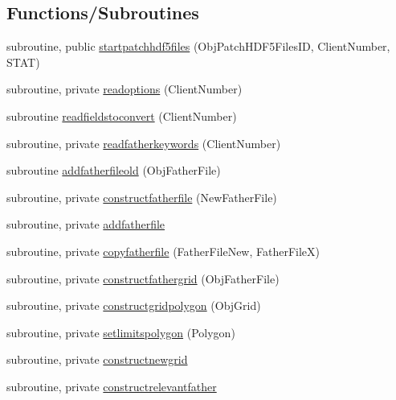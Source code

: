 \subsection*{Functions/\+Subroutines}
\begin{DoxyCompactItemize}
\item 
subroutine, public \mbox{\hyperlink{namespacemodulepatchhdf5files_a3b72c3b4723946c225c3539103a6662e}{startpatchhdf5files}} (Obj\+Patch\+H\+D\+F5\+Files\+ID, Client\+Number, S\+T\+AT)
\item 
subroutine, private \mbox{\hyperlink{namespacemodulepatchhdf5files_a420e1d0c6143b57bc6eeb40569ba53d7}{readoptions}} (Client\+Number)
\item 
subroutine \mbox{\hyperlink{namespacemodulepatchhdf5files_aae8026a08167779d4648093b3ace8cc4}{readfieldstoconvert}} (Client\+Number)
\item 
subroutine, private \mbox{\hyperlink{namespacemodulepatchhdf5files_a82e18c8d58903480429c989b796d36e5}{readfatherkeywords}} (Client\+Number)
\item 
subroutine \mbox{\hyperlink{namespacemodulepatchhdf5files_aa9460d2f9601999ea7cafe8b62a22757}{addfatherfileold}} (Obj\+Father\+File)
\item 
subroutine, private \mbox{\hyperlink{namespacemodulepatchhdf5files_ae8a0b9a239c86e85ad55ca1d7e782f96}{constructfatherfile}} (New\+Father\+File)
\item 
subroutine, private \mbox{\hyperlink{namespacemodulepatchhdf5files_af848d5f54e19e27edc34db3cb102d7d4}{addfatherfile}}
\item 
subroutine, private \mbox{\hyperlink{namespacemodulepatchhdf5files_afdb5da0b3386fdd4fe2905c0bc1c4d09}{copyfatherfile}} (Father\+File\+New, Father\+FileX)
\item 
subroutine, private \mbox{\hyperlink{namespacemodulepatchhdf5files_af7d7ef8ef3c8bc4d3657d8e7e892efe3}{constructfathergrid}} (Obj\+Father\+File)
\item 
subroutine, private \mbox{\hyperlink{namespacemodulepatchhdf5files_aa75e619d235deca359ee164e27280e4c}{constructgridpolygon}} (Obj\+Grid)
\item 
subroutine, private \mbox{\hyperlink{namespacemodulepatchhdf5files_aaa235a83ab0f98b8c034c89125019a93}{setlimitspolygon}} (Polygon)
\item 
subroutine, private \mbox{\hyperlink{namespacemodulepatchhdf5files_a0119a40208d98a8f1111fd3b51740428}{constructnewgrid}}
\item 
subroutine, private \mbox{\hyperlink{namespacemodulepatchhdf5files_a737940e59c6035bed94366c5f2116a1b}{constructrelevantfather}}

\end{DoxyCompactItemize}
